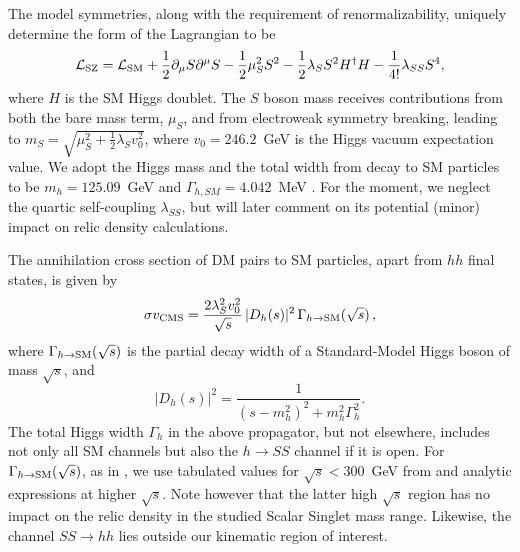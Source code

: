 \documentclass[twocolumn,showpacs,amsmath,amssymb,superscriptaddress,nofootinbib]{revtex4-1}
\begin{document}
The model symmetries, along with the requirement of renormalizability, uniquely determine the 
form of the Lagrangian to be 
\begin{equation}
{\cal L}_{\rm SZ} = {\cal L}_{\rm SM} + \frac{1}{2} \partial_\mu S \partial^\mu S - \frac{1}{2} \mu_S^2 S^2 - \frac{1}{2} \lambda_S S^2 H^\dagger H - \frac{1}{4!} \lambda_{SS} S^4,
\end{equation}
where $H$ is the SM Higgs doublet. The $S$ boson mass receives contributions from both the bare mass  
term, $\mu_S$,  and from electroweak symmetry breaking, leading to 
$m_S = \sqrt{\mu_S^2 + \frac{1}{2}{\lambda_S v_0^2} }$, 
where $v_0=246.2$~GeV is the Higgs vacuum expectation value. We adopt the Higgs mass and the total width 
from decay to SM particles to be 
$m_h=125.09$~GeV \cite{Patrignani:2016xqp} and $\Gamma_{h, SM} = 4.042$~MeV \cite{Dittmaier:2011ti}. For the moment, we neglect the quartic 
self-coupling $\lambda_{SS}$, but will later comment on its potential (minor) impact on relic density calculations. 

The annihilation cross section of DM pairs to SM particles, apart from $hh$ final states, is given by \cite{Cline:2013gha}
\begin{equation}
\sigma v_{\rm CMS} = \frac{2 \lambda_S^2 v_0^2}{\sqrt{s}} \, |D_h(s)|^2 \, \Gamma_{h\to \rm{SM}}(\sqrt{s})\,,
\label{eq:sigmav}
\end{equation}
where $\Gamma_{h\to \rm{SM}}(\sqrt{s})$ is the partial decay width of a Standard-Model Higgs boson of 
mass $\sqrt{s}$, and 
\begin{equation}
\label{hdenom}
|D_h(s)|^2 = \frac{1}{(s-m_h^2)^2+m_h^2 \Gamma_h^2 }.
\end{equation}
The total Higgs width $\Gamma_h$ in the above propagator, but not elsewhere, includes not only all 
SM channels but also the $h\to SS$ channel if it is open. For 
$\Gamma_{h\to \rm{SM}}(\sqrt{s})$, as in \cite{Cline:2013gha}, we use tabulated 
values for $\sqrt{s} < 300$~GeV from \cite{Dittmaier:2011ti} and analytic expressions at higher $\sqrt{s}$. 
Note however that the latter high $\sqrt{s}$ 
region has no impact on the relic density in the studied Scalar Singlet mass range. Likewise, 
the channel $SS\to hh$ lies outside our kinematic region of interest.
\end{document}
